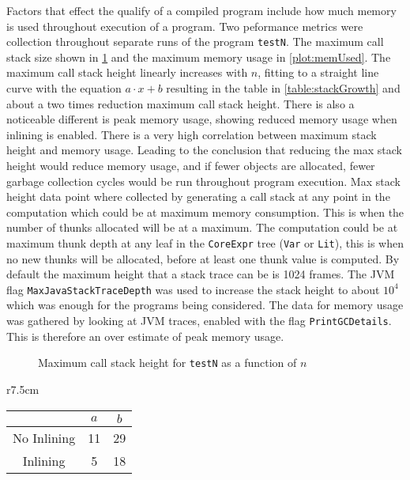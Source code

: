 \documentclass[float=false, crop=false]{standalone}
\newlength\gwidth
\newlength\gheight
\newcommand{\importMGraph}[3]{\setlength{\gwidth}{#2}\setlength{\gheight}{#3}{#1}}
\begin{document}
Factors that effect the qualify of a compiled program include how much memory
is used throughout execution of a program. Two peformance metrics were collection throughout
separate runs of the program \texttt{testN}. The maximum call stack size
shown in \cref{plot:stackSize} and the maximum 
memory usage in \cref{plot:memUsed}. 
The maximum call stack height linearly increases with $n$, fitting to a straight line curve
with the equation $a\cdot x + b$ resulting in the table in \cref{table:stackGrowth} 
and about a two times reduction maximum call stack height. 
There is also a noticeable different is peak memory usage, 
showing reduced memory usage when inlining is enabled.
There is a very high correlation between maximum stack height and memory usage.
Leading to the conclusion that reducing the max stack height would 
reduce memory usage, and if fewer objects are allocated, fewer garbage collection cycles would be
run throughout program execution.
Max stack height data point where collected by generating a call stack at any 
point in the computation which could be at maximum memory consumption. This is when 
the number of thunks allocated will be at a maximum.
The computation could be at maximum thunk depth at any leaf in the \texttt{CoreExpr} tree
(\texttt{Var} or \texttt{Lit}), this is when no new thunks will be allocated, before at least one thunk
value is computed. By default the maximum height that a stack trace can be is 1024 frames. 
The JVM flag \texttt{MaxJavaStackTraceDepth} was used to increase
the stack height to about $10^{4}$ which was enough for the programs being considered.
The data for memory usage was gathered by looking at JVM traces, 
enabled with the flag \texttt{PrintGCDetails}. 
This is therefore an over estimate of peak memory usage. 
\begin{figure}
  \centering
  \importMGraph{plotCallStackGrowth}{0.96\textwidth}{0.3\textwidth}
  \caption{Maximum call stack height for \texttt{testN} as a function of $n$}
  \label{plot:stackSize}
\end{figure}


\begin{wraptable}{r}{7.5cm}
  \centering
  \begin{tabular}{ c | c c}
  & $a$ & $b$\\
  \hline
  No Inlining & 11 & 29 \\
  Inlining & 5 & 18 
  \end{tabular}
  \caption{Fitting of the data from \cref{plot:stackSize}  
    to the line $y = a\cdot x + b$.}
  \label{table:stackGrowth}
\end{wraptable}
\end{document}
